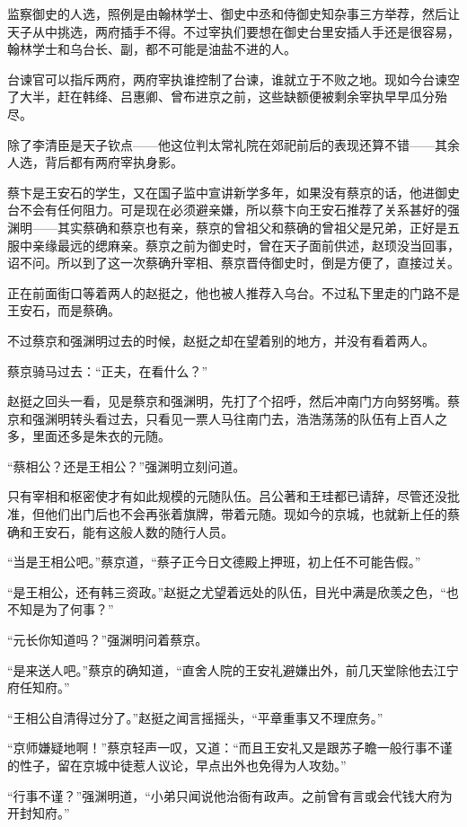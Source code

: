 监察御史的人选，照例是由翰林学士、御史中丞和侍御史知杂事三方举荐，然后让天子从中挑选，两府插手不得。不过宰执们要想在御史台里安插人手还是很容易，翰林学士和乌台长、副，都不可能是油盐不进的人。

台谏官可以指斥两府，两府宰执谁控制了台谏，谁就立于不败之地。现如今台谏空了大半，赶在韩绛、吕惠卿、曾布进京之前，这些缺额便被剩余宰执早早瓜分殆尽。

除了李清臣是天子钦点——他这位判太常礼院在郊祀前后的表现还算不错——其余人选，背后都有两府宰执身影。

蔡卞是王安石的学生，又在国子监中宣讲新学多年，如果没有蔡京的话，他进御史台不会有任何阻力。可是现在必须避亲嫌，所以蔡卞向王安石推荐了关系甚好的强渊明——其实蔡确和蔡京也有亲，蔡京的曾祖父和蔡确的曾祖父是兄弟，正好是五服中亲缘最远的缌麻亲。蔡京之前为御史时，曾在天子面前供述，赵顼没当回事，诏不问。所以到了这一次蔡确升宰相、蔡京晋侍御史时，倒是方便了，直接过关。

正在前面街口等着两人的赵挺之，他也被人推荐入乌台。不过私下里走的门路不是王安石，而是蔡确。

不过蔡京和强渊明过去的时候，赵挺之却在望着别的地方，并没有看着两人。

蔡京骑马过去：“正夫，在看什么？”

赵挺之回头一看，见是蔡京和强渊明，先打了个招呼，然后冲南门方向努努嘴。蔡京和强渊明转头看过去，只看见一票人马往南门去，浩浩荡荡的队伍有上百人之多，里面还多是朱衣的元随。

“蔡相公？还是王相公？”强渊明立刻问道。

只有宰相和枢密使才有如此规模的元随队伍。吕公著和王珪都已请辞，尽管还没批准，但他们出门后也不会再张着旗牌，带着元随。现如今的京城，也就新上任的蔡确和王安石，能有这般人数的随行人员。

“当是王相公吧。”蔡京道，“蔡子正今日文德殿上押班，初上任不可能告假。”

“是王相公，还有韩三资政。”赵挺之尤望着远处的队伍，目光中满是欣羡之色，“也不知是为了何事？”

“元长你知道吗？”强渊明问着蔡京。

“是来送人吧。”蔡京的确知道，“直舍人院的王安礼避嫌出外，前几天堂除他去江宁府任知府。”

“王相公自清得过分了。”赵挺之闻言摇摇头，“平章重事又不理庶务。”

“京师嫌疑地啊！”蔡京轻声一叹，又道：“而且王安礼又是跟苏子瞻一般行事不谨的性子，留在京城中徒惹人议论，早点出外也免得为人攻劾。”

“行事不谨？”强渊明道，“小弟只闻说他治衙有政声。之前曾有言或会代钱大府为开封知府。”

